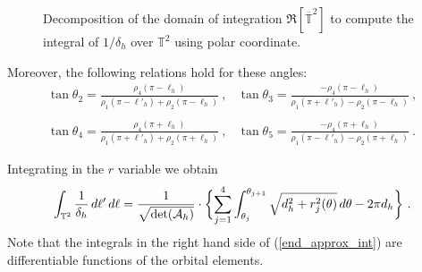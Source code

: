 \documentclass[11pt]{report}
\def\calA{\mathcal{A}}
\def\2toro{\mathbb{T}^2}
\def\trasl2toro{\overline{\mathbb{T}}^2}
\begin{document}
\begin{figure}[t]
  \centering
 \caption{Decomposition of the domain of integration
   $\mathfrak{R}[\trasl2toro]$ to compute the integral of $1/\delta_h$
   over $\2toro$ using polar coordinate.}
 \label{parall_splitting}
\end{figure}

 Moreover, the following relations hold for these angles:
\begin{equation*}\begin{array}{ll} 
    \tan\theta_2=\displaystyle\frac{\rho_4 (\pi-\ell_h)}{\rho_1
      (\pi-\ell'_h) + \rho_2 (\pi-\ell_h)}\ , &
    \tan\theta_3=\displaystyle\frac{-\rho_4 (\pi-\ell_h)}{\rho_1
      (\pi+\ell'_h) - \rho_2 (\pi-\ell_h)}\ ,\\ & \\
    \tan\theta_4= \displaystyle\frac{\rho_4 (\pi+\ell_h)}{\rho_1
      (\pi+\ell'_h) + \rho_2 (\pi+\ell_h)}\ , &
    \tan\theta_5= \displaystyle\frac{-\rho_4 (\pi+\ell_h)}{\rho_1
      (\pi-\ell'_h) - \rho_2 (\pi+\ell_h)}\ .
\end{array}	
\end{equation*}

Integrating in the $r$ variable
we obtain
%
\begin{equation}
  \int_{\2toro} {1\over {\delta_h}}\,d\ell'\,d\ell =
  \frac{1}{\sqrt{\det({\calA_h})}} \cdot \biggl\{ \sum_{j=1}^4
  \int_{\theta_j}^{\theta_{j+1}} \sqrt{d_h^2 + r_j^2(\theta)}\,
  d\theta - 2\pi d_h \biggr\}\ .
  \label{end_approx_int}
\end{equation}
%
Note that the integrals in the right hand side of (\ref{end_approx_int}) are
differentiable functions of the orbital elements.
\end{document}
